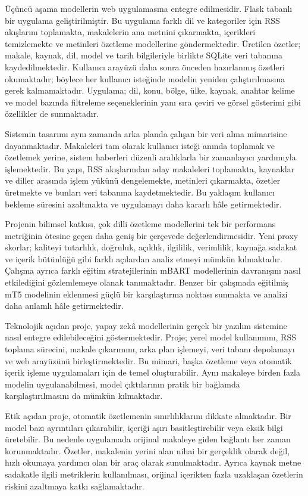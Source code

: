 Üçüncü aşama modellerin web uygulamasına entegre edilmesidir. Flask tabanlı bir uygulama geliştirilmiştir. Bu uygulama farklı dil ve kategoriler için RSS akışlarını toplamakta, makalelerin ana metnini çıkarmakta, içerikleri temizlemekte ve metinleri özetleme modellerine göndermektedir. Üretilen özetler; makale, kaynak, dil, model ve tarih bilgileriyle birlikte SQLite veri tabanına kaydedilmektedir. Kullanıcı arayüzü daha sonra önceden hazırlanmış özetleri okumaktadır; böylece her kullanıcı isteğinde modelin yeniden çalıştırılmasına gerek kalmamaktadır. Uygulama; dil, konu, bölge, ülke, kaynak, anahtar kelime ve model bazında filtreleme seçeneklerinin yanı sıra çeviri ve görsel gösterimi gibi özellikler de sunmaktadır.

Sistemin tasarımı aynı zamanda arka planda çalışan bir veri alma mimarisine dayanmaktadır. Makaleleri tam olarak kullanıcı isteği anında toplamak ve özetlemek yerine, sistem haberleri düzenli aralıklarla bir zamanlayıcı yardımıyla işlemektedir. Bu yapı, RSS akışlarından aday makaleleri toplamakta, kaynaklar ve diller arasında işlem yükünü dengelemekte, metinleri çıkarmakta, özetler üretmekte ve bunları veri tabanına kaydetmektedir. Bu yaklaşım kullanıcı bekleme süresini azaltmakta ve uygulamayı daha kararlı hâle getirmektedir.

Projenin bilimsel katkısı, çok dilli özetleme modellerini tek bir performans metriğinin ötesine geçen daha geniş bir çerçevede değerlendirmesidir. Yeni proxy skorlar; kaliteyi tutarlılık, doğruluk, açıklık, ilgililik, verimlilik, kaynağa sadakat ve içerik bütünlüğü gibi farklı açılardan analiz etmeyi mümkün kılmaktadır. Çalışma ayrıca farklı eğitim stratejilerinin mBART modellerinin davranışını nasıl etkilediğini gözlemlemeye olanak tanımaktadır. Benzer bir çalışmada eğitilmiş mT5 modelinin eklenmesi güçlü bir karşılaştırma noktası sunmakta ve analizi daha anlamlı hâle getirmektedir.

Teknolojik açıdan proje, yapay zekâ modellerinin gerçek bir yazılım sistemine nasıl entegre edilebileceğini göstermektedir. Proje; yerel model kullanımını, RSS toplama sürecini, makale çıkarımını, arka plan işlemeyi, veri tabanı depolamayı ve web arayüzünü birleştirmektedir. Bu mimari, başka özetleme veya otomatik içerik işleme uygulamaları için de temel oluşturabilir. Aynı makaleye birden fazla modelin uygulanabilmesi, model çıktılarının pratik bir bağlamda karşılaştırılmasını da mümkün kılmaktadır.

Etik açıdan proje, otomatik özetlemenin sınırlılıklarını dikkate almaktadır. Bir model bazı ayrıntıları çıkarabilir, içeriği aşırı basitleştirebilir veya eksik bilgi üretebilir. Bu nedenle uygulamada orijinal makaleye giden bağlantı her zaman korunmaktadır. Özetler, makalenin yerini alan nihai bir gerçeklik olarak değil, hızlı okumaya yardımcı olan bir araç olarak sunulmaktadır. Ayrıca kaynak metne sadakatle ilgili metriklerin kullanılması, orijinal içerikten fazla uzaklaşan özetlerin riskini azaltmaya katkı sağlamaktadır.

